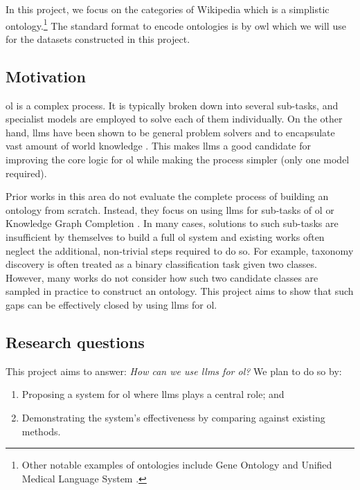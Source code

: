 In this project, we focus on the categories of Wikipedia which is a simplistic ontology.\footnote{Other notable examples of ontologies include Gene Ontology \citep{gene-ontology} and Unified Medical Language System \citep{umls}.} The standard format to encode ontologies is by \gls{owl} which we will use for the datasets constructed in this project.

\subsection*{Motivation}

\gls{ol} is a complex process. It is typically broken down into several sub-tasks, and specialist models are employed to solve each of them individually. On the other hand, \gls{llm}s have been shown to be general problem solvers \citep{gpt3} and to encapsulate vast amount of world knowledge \citep{llm-knowledge-base}. This makes \gls{llm}s a good candidate for improving the core logic for \gls{ol} while making the process simpler (only one model required).

Prior works in this area do not evaluate the complete process of building an ontology from scratch. Instead, they focus on using \gls{llm}s for sub-tasks of \gls{ol} \citep{llms4ol} or Knowledge Graph Completion \citep{yao2023exploring,cabot2021rebel}. In many cases, solutions to such sub-tasks are insufficient by themselves to build a full \gls{ol} system and existing works often neglect the additional, non-trivial steps required to do so. For example, taxonomy discovery is often treated as a binary classification task given two classes. However, many works do not consider how such two candidate classes are sampled in practice to construct an ontology. This project aims to show that such gaps can be effectively closed by using \gls{llm}s for \gls{ol}.

\subsection*{Research questions}

This project aims to answer: \emph{How can we use \gls{llm}s for \gls{ol}?} We plan to do so by:
\begin{enumerate}
    \item Proposing a system for \gls{ol} where \gls{llm}s plays a central role; and
    \item Demonstrating the system's effectiveness by comparing against existing methods.
\end{enumerate}

